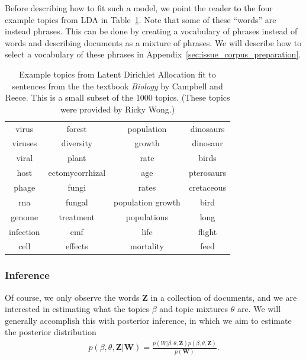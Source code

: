 Before describing how to fit such a model, we point the reader to the four
example topics from LDA in Table~\ref{table:example_lda_topics}.  Note that some
of these ``words'' are instead phrases.  This can be done by creating
a vocabulary of phrases instead of words and describing documents as a
mixture of phrases.  We will describe how to select a vocabulary of these phrases in Appendix~\ref{sec:issue_corpus_preparation}.
\begin{table}
  \caption{Example topics from Latent Dirichlet Allocation fit to sentences from the the textbook \emph{Biology} by Campbell and Reece.  This is a small subset of the 1000 topics. (These topics were provided by Ricky Wong.)}
  \center  \begin{tabular}{|c|c|c|c|}
    \hline
    virus & forest & population & dinosaurs \\
    viruses & diversity & growth & dinosaur \\
    viral & plant & rate & birds \\
    host & ectomycorrhizal & age & pterosaurs \\
    phage & fungi & rates & cretaceous \\
    rna & fungal & population growth & bird \\
    genome & treatment & populations & long \\
    infection & emf & life & flight \\
    cell & effects & mortality & feed \\
    \hline
  \end{tabular}
  \label{table:example_lda_topics}
\end{table}

\subsubsection{Inference}
Of course, we only observe the words $\bm Z$ in a collection of
documents, and we are interested in estimating what the topics $\beta$
and topic mixtures $\theta$ are.  We will generally accomplish this
with posterior inference, in which we aim to estimate the posterior
distribution
\begin{align}
  p(\beta, \theta, \bm Z | \bm W) = \frac{p(W | \beta, \theta, \bm Z) p(\beta, \theta, \bm Z)}{p(\bm W)}.
\end{align}

